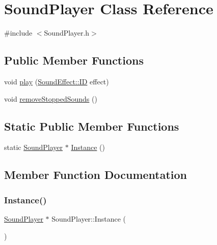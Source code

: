 \hypertarget{class_sound_player}{}\section{Sound\+Player Class Reference}
\label{class_sound_player}


{\ttfamily \#include $<$Sound\+Player.\+h$>$}

\subsection*{Public Member Functions}
\begin{DoxyCompactItemize}
\item 
void \hyperlink{class_sound_player_aa0b85f15f5b13bc41c71eeee6b0a7779}{play} (\hyperlink{namespace_sound_effect_a11ffbf1eb89e85a34cbfd5a59b2cd9cb}{Sound\+Effect\+::\+ID} effect)
\item 
void \hyperlink{class_sound_player_a3fd165dadf60b580b16367b81d84681b}{remove\+Stopped\+Sounds} ()
\end{DoxyCompactItemize}
\subsection*{Static Public Member Functions}
\begin{DoxyCompactItemize}
\item 
static \hyperlink{class_sound_player}{Sound\+Player} $\ast$ \hyperlink{class_sound_player_a4458c33c6054f60a9cd70cdbb2d1cdb0}{Instance} ()
\end{DoxyCompactItemize}


\subsection{Member Function Documentation}
\hypertarget{class_sound_player_a4458c33c6054f60a9cd70cdbb2d1cdb0}{}\label{class_sound_player_a4458c33c6054f60a9cd70cdbb2d1cdb0} 
\subsubsection{\texorpdfstring{Instance()}{Instance()}}
{\footnotesize\ttfamily \hyperlink{class_sound_player}{Sound\+Player} $\ast$ Sound\+Player\+::\+Instance (\begin{DoxyParamCaption}{ }\end{DoxyParamCaption})\hspace{0.3cm}{\ttfamily [static]}}

